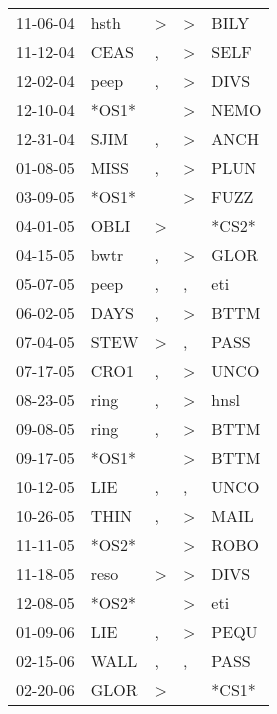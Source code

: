 \begin{supertabular}{lllll}
 11-06-04 &   hsth &     \textgreater &     \textgreater &   BILY \\
 11-12-04 &   CEAS &                , &     \textgreater &   SELF \\
 12-02-04 &   peep &                , &     \textgreater &   DIVS \\
 12-10-04 &  *OS1* &                  &     \textgreater &   NEMO \\
 12-31-04 &   SJIM &                , &     \textgreater &   ANCH \\
 01-08-05 &   MISS &                , &     \textgreater &   PLUN \\
 03-09-05 &  *OS1* &                  &     \textgreater &   FUZZ \\
 04-01-05 &   OBLI &     \textgreater &                  &  *CS2* \\
 04-15-05 &   bwtr &                , &     \textgreater &   GLOR \\
 05-07-05 &   peep &                , &                , &    eti \\
 06-02-05 &   DAYS &                , &     \textgreater &   BTTM \\
 07-04-05 &   STEW &     \textgreater &                , &   PASS \\
 07-17-05 &   CRO1 &                , &     \textgreater &   UNCO \\
 08-23-05 &   ring &                , &     \textgreater &   hnsl \\
 09-08-05 &   ring &                , &     \textgreater &   BTTM \\
 09-17-05 &  *OS1* &                  &     \textgreater &   BTTM \\
 10-12-05 &    LIE &                , &                , &   UNCO \\
 10-26-05 &   THIN &                , &     \textgreater &   MAIL \\
 11-11-05 &  *OS2* &                  &     \textgreater &   ROBO \\
 11-18-05 &   reso &     \textgreater &     \textgreater &   DIVS \\
 12-08-05 &  *OS2* &                  &     \textgreater &    eti \\
 01-09-06 &    LIE &                , &     \textgreater &   PEQU \\
 02-15-06 &   WALL &                , &                , &   PASS \\
 02-20-06 &   GLOR &     \textgreater &                  &  *CS1* \\

\end{supertabular}
